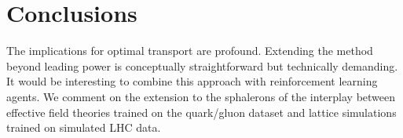 \section{Conclusions}\label{sec:conclusions}

The implications for optimal transport are profound. Extending the
method beyond leading power is conceptually straightforward but
technically demanding. It would be interesting to combine this approach
with reinforcement learning agents. We comment on the extension to the
sphalerons of the interplay between effective field theories trained on
the quark/gluon dataset and lattice simulations trained on simulated LHC
data.

